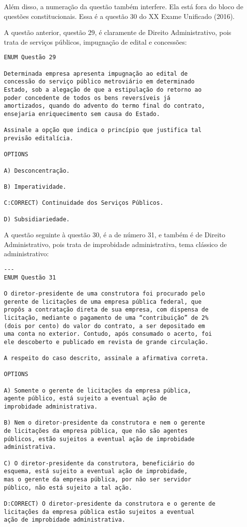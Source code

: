 \documentclass{article}
\begin{document}
Além disso, a numeração da questão também interfere. Ela está fora do
bloco de questões constitucionais. Essa é a questão 30 do XX Exame
Unificado (2016).

A questão anterior, questão 29, é claramente de Direito
Administrativo, pois trata de serviços públicos, impugnação de edital
e concessões:

\begin{verbatim}
ENUM Questão 29 
 
Determinada empresa apresenta impugnação ao edital de 
concessão do serviço público metroviário em determinado 
Estado, sob a alegação de que a estipulação do retorno ao 
poder concedente de todos os bens reversíveis já 
amortizados, quando do advento do termo final do contrato, 
ensejaria enriquecimento sem causa do Estado. 
 
Assinale a opção que indica o princípio que justifica tal 
previsão editalícia. 
 
OPTIONS

A) Desconcentração. 

B) Imperatividade. 

C:CORRECT) Continuidade dos Serviços Públicos. 

D) Subsidiariedade. 
\end{verbatim} 

A questão seguinte à questão 30, é a de número 31, e também é de
Direito Administrativo, pois trata de improbidade administrativa, tema
clássico de administrativo:

\begin{verbatim}
---
ENUM Questão 31 
 
O diretor-presidente de uma construtora foi procurado pelo 
gerente de licitações de uma empresa pública federal, que 
propôs a contratação direta de sua empresa, com dispensa de 
licitação, mediante o pagamento de uma “contribuição” de 2% 
(dois por cento) do valor do contrato, a ser depositado em 
uma conta no exterior. Contudo, após consumado o acerto, foi 
ele descoberto e publicado em revista de grande circulação. 
 
A respeito do caso descrito, assinale a afirmativa correta. 

OPTIONS

A) Somente o gerente de licitações da empresa pública, 
agente público, está sujeito a eventual ação de 
improbidade administrativa. 

B) Nem o diretor-presidente da construtora e nem o gerente 
de licitações da empresa pública, que não são agentes 
públicos, estão sujeitos a eventual ação de improbidade 
administrativa. 

C) O diretor-presidente da construtora, beneficiário do 
esquema, está sujeito a eventual ação de improbidade, 
mas o gerente da empresa pública, por não ser servidor 
público, não está sujeito a tal ação. 

D:CORRECT) O diretor-presidente da construtora e o gerente de 
licitações da empresa pública estão sujeitos a eventual 
ação de improbidade administrativa. 
\end{verbatim}
\end{document}
